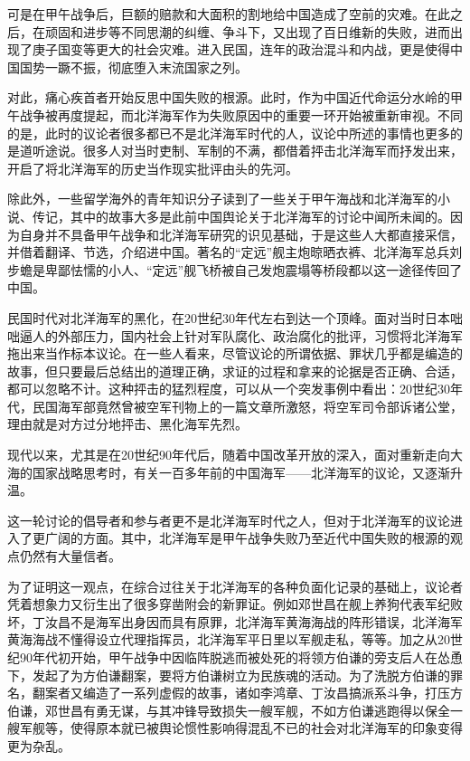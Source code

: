 \documentclass[12pt,UTF8]{ctexbook}
\begin{document}
可是在甲午战争后，巨额的赔款和大面积的割地给中国造成了空前的灾难。在此之后，在顽固和进步等不同思潮的纠缠、争斗下，又出现了百日维新的失败，进而出现了庚子国变等更大的社会灾难。进入民国，连年的政治混斗和内战，更是使得中国国势一蹶不振，彻底堕入末流国家之列。

对此，痛心疾首者开始反思中国失败的根源。此时，作为中国近代命运分水岭的甲午战争被再度提起，而北洋海军作为失败原因中的重要一环开始被重新审视。不同的是，此时的议论者很多都已不是北洋海军时代的人，议论中所述的事情也更多的是道听途说。很多人对当时吏制、军制的不满，都借着抨击北洋海军而抒发出来，开启了将北洋海军的历史当作现实批评由头的先河。

除此外，一些留学海外的青年知识分子读到了一些关于甲午海战和北洋海军的小说、传记，其中的故事大多是此前中国舆论关于北洋海军的讨论中闻所未闻的。因为自身并不具备甲午战争和北洋海军研究的识见基础，于是这些人大都直接采信，并借着翻译、节选，介绍进中国。著名的“定远”舰主炮晾晒衣裤、北洋海军总兵刘步蟾是卑鄙怯懦的小人、“定远”舰飞桥被自己发炮震塌等桥段都以这一途径传回了中国。

民国时代对北洋海军的黑化，在20世纪30年代左右到达一个顶峰。面对当时日本咄咄逼人的外部压力，国内社会上针对军队腐化、政治腐化的批评，习惯将北洋海军拖出来当作标本议论。在一些人看来，尽管议论的所谓依据、罪状几乎都是编造的故事，但只要最后总结出的道理正确，求证的过程和拿来的论据是否正确、合适，都可以忽略不计。这种抨击的猛烈程度，可以从一个突发事例中看出：20世纪30年代，民国海军部竟然曾被空军刊物上的一篇文章所激怒，将空军司令部诉诸公堂，理由就是对方过分地抨击、黑化海军先烈。

现代以来，尤其是在20世纪90年代后，随着中国改革开放的深入，面对重新走向大海的国家战略思考时，有关一百多年前的中国海军——北洋海军的议论，又逐渐升温。

这一轮讨论的倡导者和参与者更不是北洋海军时代之人，但对于北洋海军的议论进入了更广阔的方面。其中，北洋海军是甲午战争失败乃至近代中国失败的根源的观点仍然有大量信者。

为了证明这一观点，在综合过往关于北洋海军的各种负面化记录的基础上，议论者凭着想象力又衍生出了很多穿凿附会的新罪证。例如邓世昌在舰上养狗代表军纪败坏，丁汝昌不是海军出身因而具有原罪，北洋海军黄海海战的阵形错误，北洋海军黄海海战不懂得设立代理指挥员，北洋海军平日里以军舰走私，等等。加之从20世纪90年代初开始，甲午战争中因临阵脱逃而被处死的将领方伯谦的旁支后人在怂恿下，发起了为方伯谦翻案，要将方伯谦树立为民族魂的活动。为了洗脱方伯谦的罪名，翻案者又编造了一系列虚假的故事，诸如李鸿章、丁汝昌搞派系斗争，打压方伯谦，邓世昌有勇无谋，与其冲锋导致损失一艘军舰，不如方伯谦逃跑得以保全一艘军舰等，使得原本就已被舆论惯性影响得混乱不已的社会对北洋海军的印象变得更为杂乱。
\end{document}
